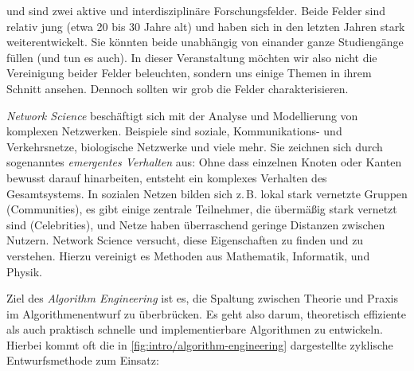  und  sind zwei aktive und interdisziplinäre Forschungsfelder.
Beide Felder sind relativ jung (etwa 20 bis 30 Jahre alt) und haben sich in den letzten Jahren stark weiterentwickelt.
Sie könnten beide unabhängig von einander ganze Studiengänge füllen (und tun es auch).
In dieser Veranstaltung möchten wir also nicht die Vereinigung beider Felder beleuchten, sondern uns einige Themen in ihrem Schnitt ansehen.
Dennoch sollten wir grob die Felder charakterisieren.

\emph{Network Science} beschäftigt sich mit der Analyse und Modellierung von komplexen Netzwerken.
Beispiele sind soziale, Kommunikations- und Verkehrsnetze, biologische Netzwerke und viele mehr.
Sie zeichnen sich durch sogenanntes \emph{emergentes Verhalten} aus: Ohne dass einzelnen Knoten oder Kanten bewusst darauf hinarbeiten, entsteht ein komplexes Verhalten des Gesamtsystems.
In sozialen Netzen bilden sich z.\,B. lokal stark vernetzte Gruppen (Communities), es gibt einige zentrale Teilnehmer, die übermäßig stark vernetzt sind (Celebrities), und Netze haben überraschend geringe Distanzen zwischen Nutzern.
Network Science versucht, diese Eigenschaften zu finden und zu verstehen.
Hierzu vereinigt es Methoden aus Mathematik, Informatik, und Physik.

\vspace{-2em}
Ziel des \emph{Algorithm Engineering} ist es, die Spaltung zwischen Theorie und Praxis im Algorithmenentwurf zu überbrücken.
Es geht also darum, theoretisch effiziente als auch praktisch schnelle und implementierbare Algorithmen zu entwickeln.
Hierbei kommt oft die in \cref{fig:intro/algorithm-engineering} dargestellte zyklische Entwurfsmethode zum Einsatz:


